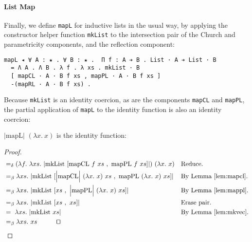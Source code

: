 \documentclass[a4paper,envcountsame,envcountsect]{llncs}
\newcommand{\eqed}[0]{\tag*{\qed}}
\newcommand{\labthm}[1]{\label{thm:#1}}
\newcommand{\reflem}[1]{Lemma \ref{lem:#1}}
\newcommand{\earg}[1]{\,\,#1}
\newcommand{\erase}[1]{\ensuremath{\lvert #1 \rvert}}
\newcommand{\Erase}[1]{\ensuremath{\Big\lvert #1 \Big\rvert}}
\newcommand{\pair}[2]{\ensuremath{[ #1 ~,~ #2]}}
\newcommand{\fun}[1]{\lambda #1 .~}
\newcommand{\by}[1]{\text{#1}}
\newcommand{\name}[1]{\textrm{#1}}
\begin{document}
\paragraph{List Map}

Finally, we define \texttt{mapL} for inductive lists in the usual way,
by applying the constructor helper function \texttt{mkList} to the
intersection pair of the Church and parametricity components, and
the reflection component:

\begin{verbatim}
mapL ◂ ∀ A : ★ . ∀ B : ★ .  Π f : A ➔ B . List · A ➔ List · B
  = Λ A . Λ B . λ f . λ xs . mkList · B
  [ mapCL · A · B f xs , mapPL · A · B f xs ]
  -(mapRL · A · B f xs) .
\end{verbatim}

Because \texttt{mkList} is an identity coercion, as are the components
\texttt{mapCL} and \texttt{mapPL}, the partial application of
\texttt{mapL} to the identity function is also an identity coercion:

\begin{theorem}
$\erase{\name{mapL}} \earg (\fun{x}{x})$ is the identity function:
\labthm{mapl}
\end{theorem}

\begin{proof}
{\small
\begin{align*}
  &=_\delta (\fun{f} \fun{xs} \erase{
    \name{mkList} \earg
    \pair{
      \name{mapCL} \earg f \earg xs
    }{
      \name{mapPL} \earg f \earg xs
    }
  }) \earg (\fun{x}{x})
  && \by{Reduce.}
  \\
  &=_\beta \fun{xs} \erase{
    \name{mkList} \earg
    \pair{
      \Erase{\name{mapCL}} \earg (\fun{x}{x}) \earg xs
    }{
      \name{mapPL} \earg (\fun{x}{x}) \earg xs
    }
  }
  && \by{By \reflem{mapcl}.}
  \\
  &=_\beta \fun{xs} \erase{
    \name{mkList} \earg
    \pair{
      xs
    }{
      \Erase{\name{mapPL}} \earg (\fun{x}{x}) \earg xs
    }
  }
  && \by{By \reflem{mappl}.}
  \\
  &=_\beta \fun{xs} \erase{
    \name{mkList} \earg
    \pair{
      xs
    }{
      xs
    }
  }
  && \by{Erase pair.}
  \\
  &=~ \fun{xs} \erase{
    \name{mkList} \earg xs
  }
  && \by{By \reflem{mkvec}.}
  \\
  &=_\beta \fun{xs}{xs}
  \eqed
\end{align*}}
\end{proof}
\end{document}

